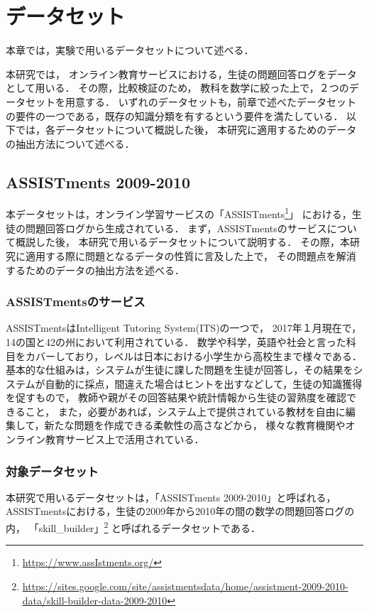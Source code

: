 \chapter{データセット}
\label{chap:dataset}
\fancyhf{}
\rhead{\thepage}
\cfoot{\thepage}


本章では，実験で用いるデータセットについて述べる．

本研究では，
オンライン教育サービスにおける，生徒の問題回答ログをデータとして用いる．
その際，比較検証のため，
教科を数学に絞った上で，２つのデータセットを用意する．
いずれのデータセットも，前章で述べたデータセットの要件の一つである，既存の知識分類を有するという要件を満たしている．
以下では，各データセットについて概説した後，
本研究に適用するためのデータの抽出方法について述べる．


\section{ASSISTments 2009-2010}
本データセットは，オンライン学習サービスの「ASSISTments\footnote{\url{https://www.assIstments.org/}}」
における，生徒の問題回答ログから生成されている．
まず，ASSISTmentsのサービスについて概説した後，
本研究で用いるデータセットについて説明する．
その際，本研究に適用する際に問題となるデータの性質に言及した上で，
その問題点を解消するためのデータの抽出方法を述べる．

\subsection{ASSISTmentsのサービス}
ASSISTmentsはIntelligent Tutoring System(ITS)の一つで，
2017年１月現在で，14の国と42の州において利用されている．
数学や科学，英語や社会と言った科目をカバーしており，レベルは日本における小学生から高校生まで様々である．
基本的な仕組みは，システムが生徒に課した問題を生徒が回答し，その結果をシステムが自動的に採点，間違えた場合はヒントを出すなどして，生徒の知識獲得を促すもので，
教師や親がその回答結果や統計情報から生徒の習熟度を確認できること，
また，必要があれば，システム上で提供されている教材を自由に編集して，新たな問題を作成できる柔軟性の高さなどから，
様々な教育機関やオンライン教育サービス上で活用されている．


\subsection{対象データセット}
本研究で用いるデータセットは，「ASSISTments 2009-2010」と呼ばれる，
ASSISTmentsにおける，生徒の2009年から2010年の間の数学の問題回答ログの内，
「skill\_builder」\footnote{\url{https://sites.google.com/site/assistmentsdata/home/assistment-2009-2010-data/skill-builder-data-2009-2010}}
と呼ばれるデータセットである．

